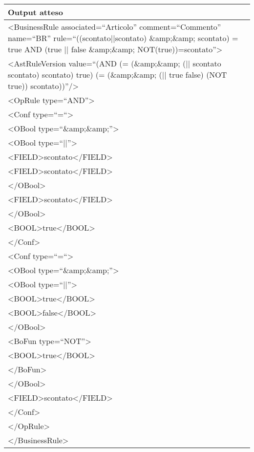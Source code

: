 \begin{center}
\begin{tabular}{|p{11cm}|} \hline
\textbf{Output atteso}\\ \hline
\textless BusinessRule associated=``Articolo'' comment=``Commento'' name=``BR'' rule=``((scontato||scontato) \&amp;\&amp; scontato) = true AND (true || false \&amp;\&amp; NOT(true))=scontato''\textgreater \\
\textless AstRuleVersion value=``(AND (= (\&amp;\&amp; (|| scontato scontato) scontato) true) (= (\&amp;\&amp; (|| true false) (NOT true)) scontato))''/\textgreater\\
 \textless OpRule type=``AND''\textgreater\\
 \textless Conf type=``=``\textgreater\\
 \textless OBool type=``\&amp;\&amp;''\textgreater \\
\textless OBool type=``||''\textgreater\\
 \textless FIELD\textgreater scontato\textless /FIELD\textgreater\\
 \textless FIELD\textgreater scontato\textless /FIELD\textgreater\\
 \textless /OBool\textgreater\\
 \textless FIELD\textgreater scontato\textless /FIELD\textgreater\\
 \textless /OBool\textgreater\\
 \textless BOOL\textgreater true\textless /BOOL\textgreater\\
 \textless /Conf\textgreater\\
 \textless Conf type=``=``\textgreater\\
 \textless OBool type=``\&amp;\&amp;''\textgreater\\
 \textless OBool type=``||''\textgreater\\
 \textless BOOL\textgreater true\textless /BOOL\textgreater\\
 \textless BOOL\textgreater false\textless /BOOL\textgreater\\
 \textless /OBool\textgreater\\
 \textless BoFun type=``NOT''\textgreater\\
 \textless BOOL\textgreater true\textless /BOOL\textgreater\\
 \textless /BoFun\textgreater\\
 \textless /OBool\textgreater\\
 \textless FIELD\textgreater scontato\textless /FIELD\textgreater\\
 \textless /Conf\textgreater\\
 \textless /OpRule\textgreater\\
 \textless /BusinessRule\textgreater \\
 \hline
\end{tabular} \\
\end{center}

